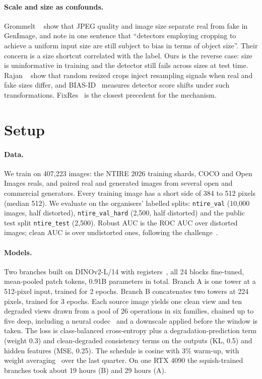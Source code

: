 \documentclass[10pt,twocolumn,letterpaper]{article}
\begin{document}
\paragraph{Scale and size as confounds.} Grommelt
\etal~\cite{grommelt2024fakeorjpeg} show that JPEG quality and image size
separate real from fake in GenImage, and note in one sentence that
``detectors employing cropping to achieve a uniform input size are still
subject to bias in terms of object size''. Their concern is a size shortcut
correlated with the label. Ours is the reverse case: size is uninformative in
training and the detector still fails across sizes at test time. Rajan
\etal~\cite{rajan2025aligned} show that random resized crops inject
resampling signals when real and fake sizes differ, and BIAS-ID~\cite{ricker2026biasid}
measures detector score shifts under such transformations. FixRes~\cite{touvron2019fixres}
is the closest precedent for the mechanism.

\section{Setup}
\label{sec:setup}

\paragraph{Data.} We train on 407,223 images: the NTIRE 2026 training shards,
COCO and Open Images reals, and paired real and generated images from several
open and commercial generators. Every training image has a short side of 384 to
512 pixels (median 512). We evaluate on the organisers' labelled splits:
\texttt{ntire\_val} (10,000 images, half distorted), \texttt{ntire\_val\_hard}
(2,500, half distorted) and the public test split \texttt{ntire\_test}
(2,500). Robust AUC is the ROC AUC over distorted images; clean AUC is over
undistorted ones, following the challenge~\cite{gushchin2026ntire}.

\paragraph{Models.} Two branches built on DINOv2-L/14 with
registers~\cite{oquab2024dinov2,darcet2024registers}, all 24 blocks
fine-tuned, mean-pooled patch tokens, 0.91B parameters in total. Branch A is
one tower at a 512-pixel input, trained for 2 epochs. Branch B concatenates
two towers at 224 pixels, trained for 3 epochs. Each source image yields one
clean view and ten degraded views drawn from a pool of 26 operations in six
families, chained up to five deep, including a neural codec~\cite{balle2018hyperprior}
and a downscale applied before the window is taken. The loss is
class-balanced cross-entropy plus a degradation-prediction term (weight 0.3)
and clean-degraded consistency terms on the outputs (KL, 0.5) and hidden
features (MSE, 0.25). The schedule is cosine with 3\% warm-up, with weight
averaging~\cite{izmailov2018swa} over the last quarter. On one RTX 4090 the
squish-trained branches took about 19 hours (B) and 29 hours (A).
\end{document}
